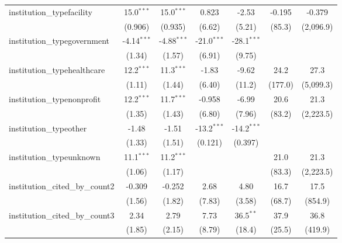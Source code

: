 \begin{tabular}{lcccccc}
   institution\_typefacility             & 15.0$^{***}$  & 15.0$^{***}$  & 0.823         & -2.53         & -0.195       & -0.379\\   
                                         & (0.906)       & (0.935)       & (6.62)        & (5.21)        & (85.3)       & (2,096.9)\\   
   institution\_typegovernment           & -4.14$^{***}$ & -4.88$^{***}$ & -21.0$^{***}$ & -28.1$^{***}$ &              &   \\   
                                         & (1.34)        & (1.57)        & (6.91)        & (9.75)        &              &   \\   
   institution\_typehealthcare           & 12.2$^{***}$  & 11.3$^{***}$  & -1.83         & -9.62         & 24.2         & 27.3\\   
                                         & (1.11)        & (1.44)        & (6.40)        & (11.2)        & (177.0)      & (5,099.3)\\   
   institution\_typenonprofit            & 12.2$^{***}$  & 11.7$^{***}$  & -0.958        & -6.99         & 20.6         & 21.3\\   
                                         & (1.35)        & (1.43)        & (6.80)        & (7.96)        & (83.2)       & (2,223.5)\\   
   institution\_typeother                & -1.48         & -1.51         & -13.2$^{***}$ & -14.2$^{***}$ &              &   \\   
                                         & (1.33)        & (1.51)        & (0.121)       & (0.397)       &              &   \\   
   institution\_typeunknown              & 11.1$^{***}$  & 11.2$^{***}$  &               &               & 21.0         & 21.3\\   
                                         & (1.06)        & (1.17)        &               &               & (83.3)       & (2,223.5)\\   
   institution\_cited\_by\_count2        & -0.309        & -0.252        & 2.68          & 4.80          & 16.7         & 17.5\\   
                                         & (1.56)        & (1.82)        & (7.83)        & (3.58)        & (68.7)       & (854.9)\\   
   institution\_cited\_by\_count3        & 2.34          & 2.79          & 7.73          & 36.5$^{**}$   & 37.9         & 36.8\\   
                                         & (1.85)        & (2.15)        & (8.79)        & (18.4)        & (25.5)       & (419.9)\\   

\end{tabular}
